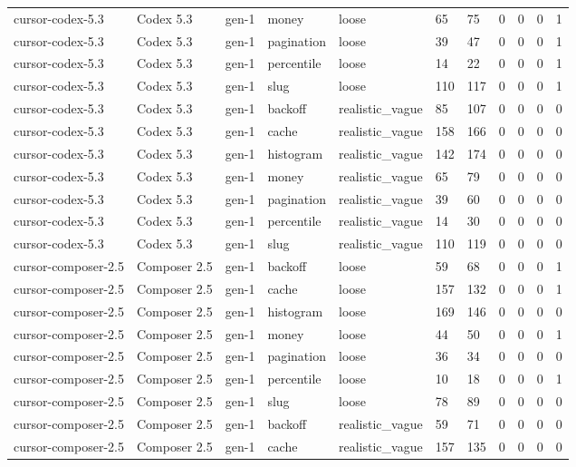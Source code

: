 \begin{tabular}{lllllllllll}
cursor-codex-5.3 & Codex 5.3 & gen-1 & money & loose & 65 & 75 & 0 & 0 & 0 & 1 \\
cursor-codex-5.3 & Codex 5.3 & gen-1 & pagination & loose & 39 & 47 & 0 & 0 & 0 & 1 \\
cursor-codex-5.3 & Codex 5.3 & gen-1 & percentile & loose & 14 & 22 & 0 & 0 & 0 & 1 \\
cursor-codex-5.3 & Codex 5.3 & gen-1 & slug & loose & 110 & 117 & 0 & 0 & 0 & 1 \\
cursor-codex-5.3 & Codex 5.3 & gen-1 & backoff & realistic\_vague & 85 & 107 & 0 & 0 & 0 & 0 \\
cursor-codex-5.3 & Codex 5.3 & gen-1 & cache & realistic\_vague & 158 & 166 & 0 & 0 & 0 & 0 \\
cursor-codex-5.3 & Codex 5.3 & gen-1 & histogram & realistic\_vague & 142 & 174 & 0 & 0 & 0 & 0 \\
cursor-codex-5.3 & Codex 5.3 & gen-1 & money & realistic\_vague & 65 & 79 & 0 & 0 & 0 & 0 \\
cursor-codex-5.3 & Codex 5.3 & gen-1 & pagination & realistic\_vague & 39 & 60 & 0 & 0 & 0 & 0 \\
cursor-codex-5.3 & Codex 5.3 & gen-1 & percentile & realistic\_vague & 14 & 30 & 0 & 0 & 0 & 0 \\
cursor-codex-5.3 & Codex 5.3 & gen-1 & slug & realistic\_vague & 110 & 119 & 0 & 0 & 0 & 0 \\
cursor-composer-2.5 & Composer 2.5 & gen-1 & backoff & loose & 59 & 68 & 0 & 0 & 0 & 1 \\
cursor-composer-2.5 & Composer 2.5 & gen-1 & cache & loose & 157 & 132 & 0 & 0 & 0 & 1 \\
cursor-composer-2.5 & Composer 2.5 & gen-1 & histogram & loose & 169 & 146 & 0 & 0 & 0 & 0 \\
cursor-composer-2.5 & Composer 2.5 & gen-1 & money & loose & 44 & 50 & 0 & 0 & 0 & 1 \\
cursor-composer-2.5 & Composer 2.5 & gen-1 & pagination & loose & 36 & 34 & 0 & 0 & 0 & 0 \\
cursor-composer-2.5 & Composer 2.5 & gen-1 & percentile & loose & 10 & 18 & 0 & 0 & 0 & 1 \\
cursor-composer-2.5 & Composer 2.5 & gen-1 & slug & loose & 78 & 89 & 0 & 0 & 0 & 0 \\
cursor-composer-2.5 & Composer 2.5 & gen-1 & backoff & realistic\_vague & 59 & 71 & 0 & 0 & 0 & 0 \\
cursor-composer-2.5 & Composer 2.5 & gen-1 & cache & realistic\_vague & 157 & 135 & 0 & 0 & 0 & 0 \\

\end{tabular}
